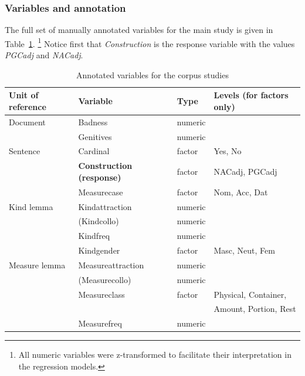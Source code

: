 \subsubsection{Variables and annotation}
\label{sec:variablesandannotation}

The full set of manually annotated variables for the main study is given in Table~\ref{tab:variables}.%
\footnote{All numeric variables were z-transformed to facilitate their interpretation in the regression models.}
Notice first that \textit{Construction} is the response variable with the values \textit{PGCadj} and \textit{NACadj}.

\begin{table}
  \centering
  \begin{tabular}{llll}
    Unit of reference & Variable                      & Type    & Levels (for factors only) \\
    \midrule
    Document       & Badness                          & numeric &                           \\
                   & Genitives                        & numeric &                           \\
    Sentence       & Cardinal                         & factor  & Yes, No                   \\
                   & \textbf{Construction (response)} & factor  & NACadj, PGCadj            \\
                   & Measurecase                      & factor  & Nom, Acc, Dat             \\
    Kind lemma     & Kindattraction                   & numeric &                           \\
                   & (Kindcollo)                      & numeric &                           \\
                   & Kindfreq                         & numeric &                           \\
		   & Kindgender                       & factor  & Masc, Neut, Fem             \\
    Measure lemma  & Measureattraction                & numeric &                           \\
                   & (Measurecollo)                   & numeric &                           \\
                   & Measureclass                     & factor  & Physical, Container,      \\
                   &                                  &         & Amount, Portion, Rest     \\
                   & Measurefreq                      & numeric &                           \\
  \end{tabular}
  \caption{Annotated variables for the corpus studies}
  \label{tab:variables}
\end{table}

